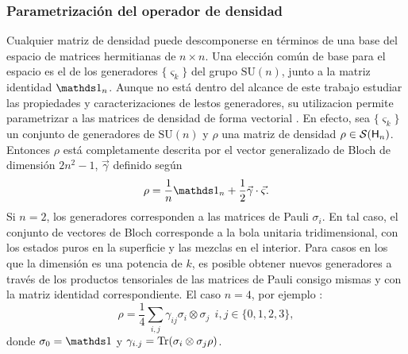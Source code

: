 \subsubsection{Parametrización del operador de densidad}
Cualquier matriz de densidad puede descomponerse en términos de una base del espacio de matrices hermitianas de $n\times n$. Una elección común de base para el espacio es el de los generadores $\{\varsigma_{k}\}$ del grupo $\text{SU}(n)$, junto a la matriz identidad $\Id_{n}$. Aunque no está dentro del alcance de este trabajo estudiar las propiedades y caracterizaciones de lestos generadores, su utilizacion permite parametrizar a las matrices de densidad de forma vectorial \cite{Bruning}. En efecto, sea $\{\varsigma_{k}\}$ un conjunto de generadores de $\text{SU}(n)$ y $\rho$ una matriz de densidad $\rho\in\mathcal{S}({\sf H}_{n})$. Entonces $\rho$ está completamente descrita por el vector generalizado de Bloch de dimensión $2n^{2}-1$, $\vec{\gamma}$ definido según
\begin{equation}
    \rho=\frac{1}{n}\Id_{n}+\frac{1}{2}\vec{\gamma}\cdot\vec{\varsigma}.
\end{equation}
Si $n=2$, los generadores corresponden a las matrices de Pauli $\sigma_{i}$. En tal caso, el conjunto de vectores de Bloch corresponde a la bola unitaria tridimensional, con los estados puros en la superficie y las mezclas en el interior. Para casos en los que la dimensión es una potencia de $k$, es posible obtener nuevos generadores a través de los productos tensoriales de las matrices de Pauli consigo mismas y con la matriz identidad correspondiente. El caso $n=4$, por ejemplo \cite{Chuang}:
\begin{equation}
    \rho=\frac{1}{4}\sum_{i,j}\gamma_{ij}\sigma_{i}\otimes \sigma_{j} \ \ i,j\in\{0,1,2,3\},
\end{equation}
donde $\sigma_{0}=\Id$ y $\gamma_{i.j}=\Tr(\sigma_{i}\otimes \sigma_{j}\rho)$.
